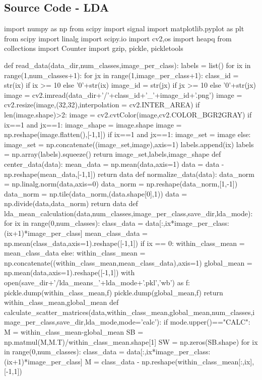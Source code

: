 \documentclass{article}
\begin{document}
\subsection{Source Code - LDA}
\begin{python}
import numpy as np
from scipy import signal
import matplotlib.pyplot as plt
from scipy import linalg
import scipy.io
import cv2,os
import heapq
from collections import Counter
import gzip, pickle, pickletools

def read_data(data_dir,num_classes,image_per_class):
	labels = list()
	for ix in range(1,num_classes+1):
		for jx in range(1,image_per_class+1):
			class_id = str(ix) if ix >= 10 else '0'+str(ix)
			image_id = str(jx) if jx >= 10 else '0'+str(jx)
			image = cv2.imread(data_dir+'/'+class_id+'_'+image_id+'.png')
			image = cv2.resize(image,(32,32),interpolation = cv2.INTER_AREA)
			if len(image.shape)>2:
				image = cv2.cvtColor(image,cv2.COLOR_BGR2GRAY)
			if ix==1 and jx==1:
				image_shape = image.shape
			image = np.reshape(image.flatten(),[-1,1])
			if ix==1 and jx==1:
				image_set = image
			else:
				image_set = np.concatenate((image_set,image),axis=1)
			labels.append(ix)
	labels = np.array(labels).squeeze()
	return image_set,labels,image_shape
def center_data(data):
	mean_data = np.mean(data,axis=1)
	data = data - np.reshape(mean_data,[-1,1])
	return data
def normalize_data(data):
	data_norm = np.linalg.norm(data,axis=0)
	data_norm = np.reshape(data_norm,[1,-1])
	data_norm = np.tile(data_norm,(data.shape[0],1))
	data = np.divide(data,data_norm)
	return data
def lda_mean_calculation(data,num_classes,image_per_class,save_dir,lda_mode):
	for ix in range(0,num_classes):
		class_data = data[:,ix*image_per_class:(ix+1)*image_per_class]
		mean_class_data = np.mean(class_data,axis=1).reshape([-1,1])
		if ix == 0:
			within_class_mean = mean_class_data
		else:
			within_class_mean = np.concatenate((within_class_mean,mean_class_data),axis=1)
	global_mean = np.mean(data,axis=1).reshape([-1,1])
	with open(save_dir+'/lda_means_'+lda_mode+'.pkl','wb') as f:
		pickle.dump(within_class_mean,f)
		pickle.dump(global_mean,f)
	return within_class_mean,global_mean
def calculate_scatter_matrices(data,within_class_mean,global_mean,num_classes,image_per_class,save_dir,lda_mode,mode='calc'):
	if mode.upper()=="CALC":
		M = within_class_mean-global_mean
		SB = np.matmul(M,M.T)/within_class_mean.shape[1]
		SW = np.zeros(SB.shape)
		for ix in range(0,num_classes):
			class_data = data[:,ix*image_per_class:(ix+1)*image_per_class]
			M = class_data - np.reshape(within_class_mean[:,ix],[-1,1])

\end{python}
\end{document}
